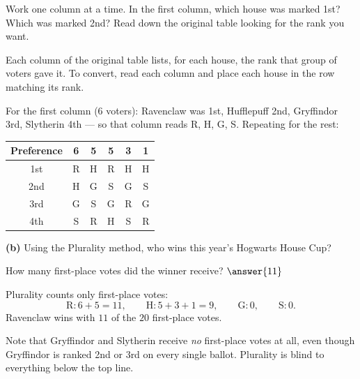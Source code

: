 \documentclass[12pt]{ximera}
\begin{document}
\begin{problem}
\begin{prompt}
\begin{hint}
Work one column at a time. In the first column, which house was marked 1st? Which was
marked 2nd? Read down the original table looking for the rank you want.
\end{hint}

\begin{feedback}
Each column of the original table lists, for each house, the rank that group of voters
gave it. To convert, read each column and place each house in the row matching its
rank.

For the first column ($6$ voters): Ravenclaw was 1st, Hufflepuff 2nd, Gryffindor 3rd,
Slytherin 4th --- so that column reads R, H, G, S. Repeating for the rest:
\begin{center}
\begin{tabular}{c|ccccc}
Preference & 6 & 5 & 5 & 3 & 1 \\\hline
1st & R & H & R & H & H \\
2nd & H & G & S & G & S \\
3rd & G & S & G & R & G \\
4th & S & R & H & S & R
\end{tabular}
\end{center}
\end{feedback}
\end{prompt}

\begin{prompt}
\textbf{(b)} Using the Plurality method, who wins this year's Hogwarts House Cup?

\begin{multipleChoice}
\end{multipleChoice}

How many first-place votes did the winner receive? $\answer{11}$

\begin{feedback}
Plurality counts only first-place votes:
\[
\text{R}: 6+5 = 11, \qquad \text{H}: 5+3+1 = 9, \qquad \text{G}: 0, \qquad \text{S}: 0.
\]
Ravenclaw wins with $11$ of the $20$ first-place votes.

Note that Gryffindor and Slytherin receive \emph{no} first-place votes at all, even
though Gryffindor is ranked 2nd or 3rd on every single ballot. Plurality is blind to
everything below the top line.
\end{feedback}
\end{prompt}
\end{problem}
\end{document}
